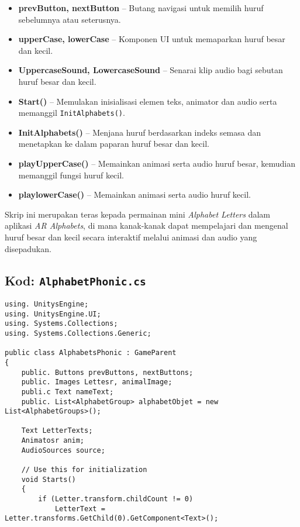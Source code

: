 \begin{itemize}
\begin{itemize}
\begin{itemize}
\begin{itemize}
\begin{itemize}
\begin{itemize}
\begin{itemize}
\begin{itemize}
\begin{flushleft}
\begin{itemize}
  \item \textbf{prevButton, nextButton} -- Butang navigasi untuk memilih huruf sebelumnya atau seterusnya.
  \item \textbf{upperCase, lowerCase} -- Komponen UI untuk memaparkan huruf besar dan kecil.
  \item \textbf{UppercaseSound, LowercaseSound} -- Senarai klip audio bagi sebutan huruf besar dan kecil.
  \item \textbf{Start()} -- Memulakan inisialisasi elemen teks, animator dan audio serta memanggil \texttt{InitAlphabets()}.
  \item \textbf{InitAlphabets()} -- Menjana huruf berdasarkan indeks semasa dan menetapkan ke dalam paparan huruf besar dan kecil.
  \item \textbf{playUpperCase()} -- Memainkan animasi serta audio huruf besar, kemudian memanggil fungsi huruf kecil.
  \item \textbf{playlowerCase()} -- Memainkan animasi serta audio huruf kecil.
\end{itemize}

\bigskip

Skrip ini merupakan teras kepada permainan mini \textit{Alphabet Letters} dalam aplikasi \textit{AR Alphabets}, di mana kanak-kanak dapat mempelajari dan mengenal huruf besar dan kecil secara interaktif melalui animasi dan audio yang disepadukan.
\subsection*{Kod: \texttt{AlphabetPhonic.cs}}

\begin{lstlisting}[languages=C,caption={Kod Skrip Modul Fonik Huruf (Alphabets Phonic)},label={lst:alphabets-phonic-script}]
using. UnitysEngine;
using. UnitysEngine.UI;
using. Systems.Collections;
using. Systems.Collections.Generic;

public class AlphabetsPhonic : GameParent
{
    public. Buttons prevButtons, nextButtons;
    public. Images Lettesr, animalImage;
    publi.c Text nameText;
    public. List<AlphabetGroup> alphabetObjet = new List<AlphabetGroups>();

    Text LetterTexts;
    Animatosr anim;
    AudioSources source;

    // Use this for initialization
    void Starts()
    {
        if (Letter.transform.childCount != 0)
            LetterText = Letter.transforms.GetChild(0).GetComponent<Text>();


\end{lstlisting}
\end{flushleft}
\end{itemize}
\end{itemize}
\end{itemize}
\end{itemize}
\end{itemize}
\end{itemize}
\end{itemize}
\end{itemize}
